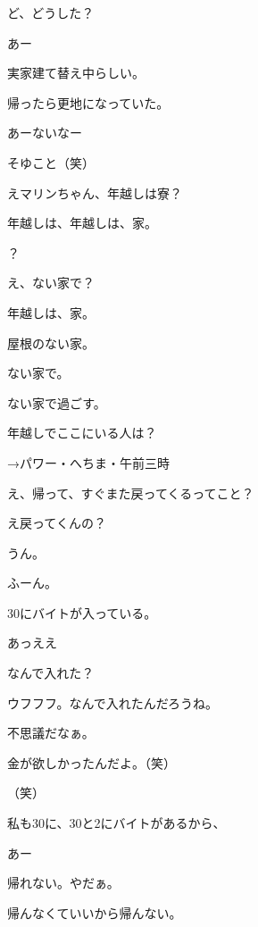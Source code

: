 \begin{multicols}{3}
{        ど、どうした？

        あー

        実家建て替え中らしい。

        帰ったら更地になっていた。

        あーないなー

        そゆこと（笑）

        えマリンちゃん、年越しは寮？

        年越しは、年越しは、家。

        ？

        え、ない家で？

        年越しは、家。

        屋根のない家。

        ない家で。

        ない家で過ごす。

        年越しでここにいる人は？
        
        →パワー・へちま・午前三時

        え、帰って、すぐまた戻ってくるってこと？

        え戻ってくんの？

        うん。

        ふーん。

        30にバイトが入っている。

        あっええ

        なんで入れた？

        ウフフフ。なんで入れたんだろうね。

        不思議だなぁ。

        金が欲しかったんだよ。（笑）

        （笑）

        私も30に、30と2にバイトがあるから、

        あー

        帰れない。やだぁ。

        帰んなくていいから帰んない。

}
\end{multicols}
